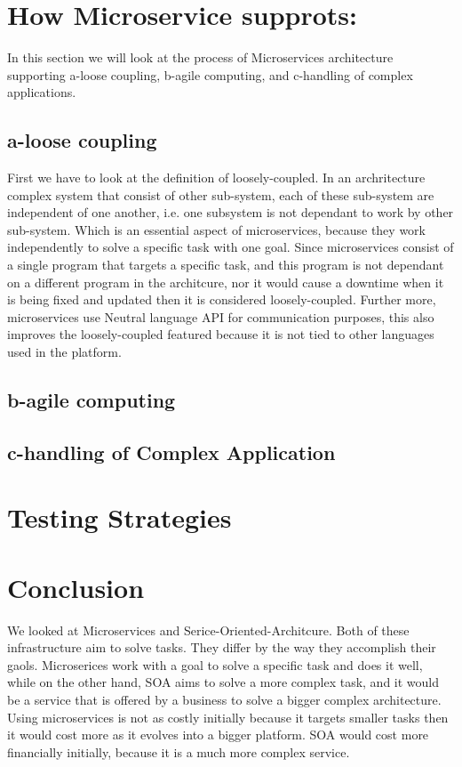 \documentclass{IEEEtran}
\begin{document}
	\section{How Microservice supprots:}
		In this section we will look at the process of Microservices architecture supporting a-loose coupling, b-agile computing, and c-handling of complex applications.  

		\subsection{a-loose coupling}
			First we have to look at the definition of loosely-coupled. In an archritecture complex system that consist of other sub-system, each of these sub-system are independent of one another, i.e. one subsystem is not dependant to work by other sub-system. Which is an essential aspect of microservices, because they work independently to solve a specific task with one goal. Since microservices consist of a single program that targets a specific task, and this program is not dependant on a different program in the architcure, nor it would cause a downtime when it is being fixed and updated then it is considered loosely-coupled. Further more, microservices use Neutral language API for communication purposes, this also improves the loosely-coupled featured because it is not tied to other languages used in the platform. 
		\subsection{b-agile computing}
			
		\subsection{c-handling of Complex Application}
	

	\section{Testing Strategies}
	\section{Conclusion}
		We looked at Microservices and Serice-Oriented-Architcure. Both of these infrastructure aim to solve tasks. They differ by the way they accomplish their gaols. Microserices work with a goal to solve a specific task and does it well, while on the other hand, SOA aims to solve a more complex task, and it would be a service that is offered by a business to solve a bigger complex architecture. Using microservices is not as costly initially because it targets smaller tasks then it would cost more as it evolves into a bigger platform. SOA would cost more financially initially, because it is a much more complex service. 




	\newpage
	
	
\end{document}

